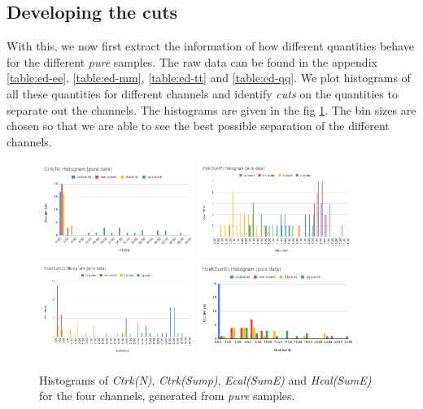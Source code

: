 \subsection{Developing the cuts}
With this, we now first extract the information of how different quantities behave for the different \textit{pure} samples. The raw data can be found in the appendix \ref{table:ed-ee}, \ref{table:ed-mm}, \ref{table:ed-tt} and \ref{table:ed-qq}. We plot histograms of all these quantities for different channels and identify \textit{cuts} on the quantities to separate out the channels. The histograms are given in the fig \ref{fig:hist}. The bin sizes are chosen so that we are able to see the best possible separation of the different channels.\\
\begin{figure}[h!]
    \centering
    \includegraphics[width = 0.45\textwidth]{CtrkN-pure.png}
    \includegraphics[width = 0.45\textwidth]{CtrkP-pure.png}
    \includegraphics[width = 0.45\textwidth]{Ecal-pure.png}
    \includegraphics[width = 0.45\textwidth]{Hcal-pure.png}
    \caption{Histograms of \textit{Ctrk(N)}, \textit{Ctrk(Sump)}, \textit{Ecal(SumE)} and \textit{Hcal(SumE)} for the four channels, generated from \textit{pure} samples.}
    \label{fig:hist}
\end{figure}
